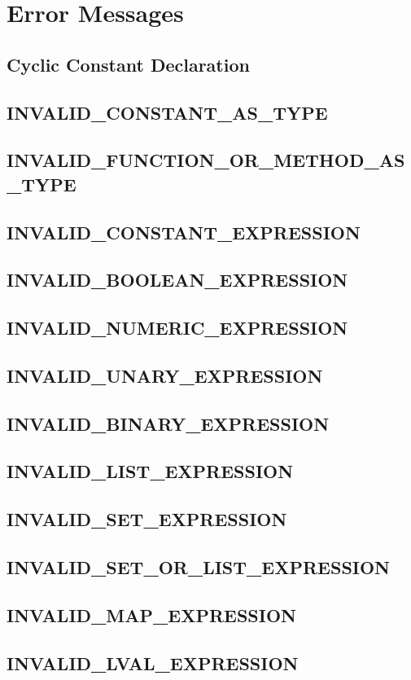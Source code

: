 \chapter{Error Messages}

\section{Cyclic Constant Declaration}
\section{INVALID_CONSTANT_AS_TYPE}
\section{INVALID_FUNCTION_OR_METHOD_AS_TYPE}
\section{INVALID_CONSTANT_EXPRESSION}
\section{INVALID_BOOLEAN_EXPRESSION}
\section{INVALID_NUMERIC_EXPRESSION}
\section{INVALID_UNARY_EXPRESSION}
\section{INVALID_BINARY_EXPRESSION}
\section{INVALID_LIST_EXPRESSION}
\section{INVALID_SET_EXPRESSION}
\section{INVALID_SET_OR_LIST_EXPRESSION}
\section{INVALID_MAP_EXPRESSION}
\section{INVALID_LVAL_EXPRESSION}
